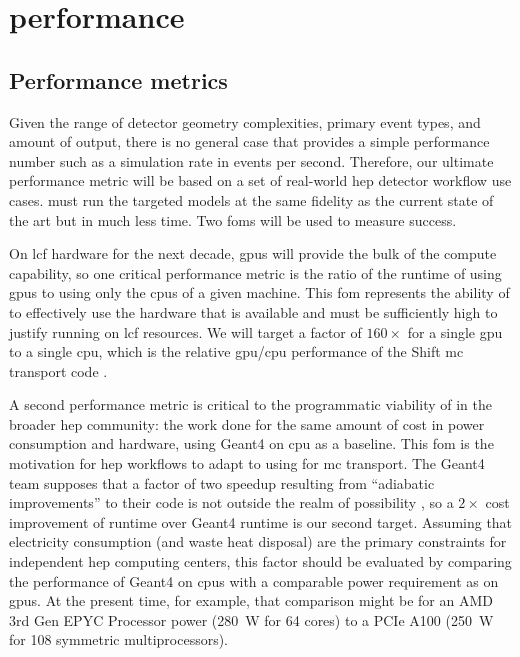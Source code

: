 \section{\celeritas performance}


\subsection{Performance metrics}

Given the range of detector geometry complexities, primary event types, and
amount of output, there is no general case that provides a simple performance
number such as a simulation rate in events per second. Therefore, our ultimate
performance metric will be based on a set of real-world \acs{hep} detector
workflow use cases. \celeritas must run the targeted models at the same fidelity
as the current state of the art but in much less time. Two \acp{fom} will be
used to measure success.

On \ac{lcf} hardware for the next decade, \acp{gpu} will provide the bulk of the
compute capability, so one critical performance metric is the ratio of the
runtime of \celeritas using \acp{gpu} to using only the \acp{cpu} of a given
machine. This \ac{fom} represents the ability of \celeritas to effectively use
the hardware that is available and must be sufficiently high to justify running
on \ac{lcf} resources. We will target a factor of $160\times$ for a single
\ac{gpu} to a single \ac{cpu}, which is the relative \ac{gpu}/\ac{cpu}
performance of the Shift \ac{mc} transport code
\cite{hamilton_continuous-energy_2019}.

A second performance metric is critical to the programmatic viability of
\celeritas in the broader \ac{hep} community: the work done for the same amount
of cost in power consumption and hardware, using Geant4 on \ac{cpu} as a
baseline. This \ac{fom} is the motivation for \ac{hep} workflows to adapt to
using \celeritas for \ac{mc} transport. The Geant4 team supposes that a factor
of two speedup resulting from ``adiabatic improvements'' to their code is not
outside the realm of possibility \cite{marc_verderi_geant4_2021}, so a $2
\times$ cost improvement of \celeritas runtime over Geant4 runtime is our second
target. Assuming that electricity consumption (and waste heat disposal) are the
primary constraints for independent \ac{hep} computing centers, this factor
should be evaluated by comparing the performance of Geant4 on \acp{cpu} with a
comparable power requirement as \celeritas on \acp{gpu}. At the present time,
for example, that comparison might be for an AMD 3rd Gen EPYC Processor power
(\SI{280}{\watt} for 64 cores) to a PCIe \nvidia A100 (\SI{250}{\watt} for 108
symmetric multiprocessors).

